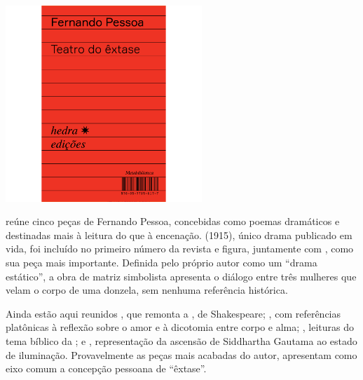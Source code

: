 \begin{center}
\hspace*{-3.6cm}
\hspace*{3.1cm}\includegraphics[width=74mm]{./grid/pessoa.jpg}
\end{center}

\hspace*{-7cm}\hrulefill\hspace*{-7cm}

\medskip

 reúne cinco peças de Fernando Pessoa, concebidas 
como poemas dramáticos e destinadas mais à leitura do que à encenação. 
{} (1915), único drama publicado em vida, foi incluído no
primeiro número da revista {} e figura, juntamente com
{}, como sua peça mais importante.  Definida pelo próprio autor
como um ``drama estático'', a obra de matriz simbolista apresenta o diálogo
entre três mulheres que velam o corpo de uma donzela, sem nenhuma referência
histórica.

Ainda estão aqui reunidos {}, que remonta a {}, de Shakespeare; {}, com referências platônicas à reflexão sobre o amor e à dicotomia entre corpo e alma; {}, leituras do
tema bíblico da {}; e {}, representação da ascensão de Siddhartha Gautama ao estado de iluminação. Provavelmente as peças mais acabadas do autor, apresentam como eixo comum a concepção pessoana de ``êxtase''. 
%

\vfill

\hspace*{-.4cm}\begin{minipage}[c]{.5\linewidth}
\small{
{}}
\end{minipage}

